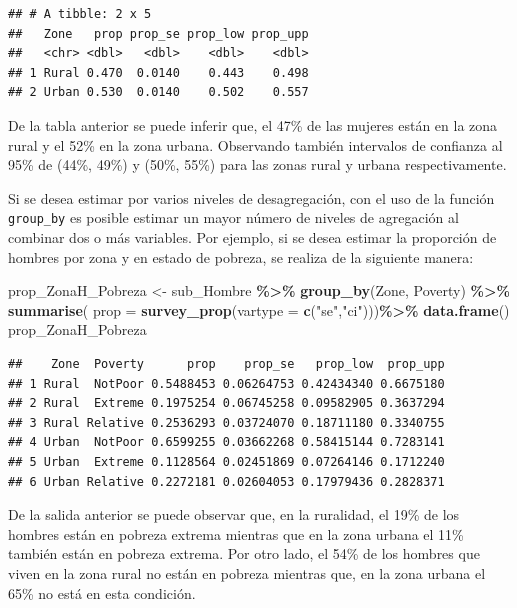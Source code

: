 \documentclass[
  12pt,
]{book}
\newenvironment{Shaded}{\begin{snugshade}}{\end{snugshade}}
\newcommand{\AttributeTok}[1]{\textcolor[rgb]{0.13,0.29,0.53}{#1}}
\newcommand{\FunctionTok}[1]{\textcolor[rgb]{0.13,0.29,0.53}{\textbf{#1}}}
\newcommand{\NormalTok}[1]{#1}
\newcommand{\OtherTok}[1]{\textcolor[rgb]{0.56,0.35,0.01}{#1}}
\newcommand{\SpecialCharTok}[1]{\textcolor[rgb]{0.81,0.36,0.00}{\textbf{#1}}}
\newcommand{\StringTok}[1]{\textcolor[rgb]{0.31,0.60,0.02}{#1}}
\begin{document}
\begin{verbatim}
## # A tibble: 2 x 5
##   Zone   prop prop_se prop_low prop_upp
##   <chr> <dbl>   <dbl>    <dbl>    <dbl>
## 1 Rural 0.470  0.0140    0.443    0.498
## 2 Urban 0.530  0.0140    0.502    0.557
\end{verbatim}

De la tabla anterior se puede inferir que, el 47\% de las mujeres están en la zona rural y el 52\% en la zona urbana. Observando también intervalos de confianza al 95\% de (44\%, 49\%) y (50\%, 55\%) para las zonas rural y urbana respectivamente.

Si se desea estimar por varios niveles de desagregación, con el uso de la función \texttt{group\_by} es posible estimar un mayor número de niveles de agregación al combinar dos o más variables. Por ejemplo, si se desea estimar la proporción de hombres por zona y en estado de pobreza, se realiza de la siguiente manera:

\begin{Shaded}
\begin{Highlighting}[]
\NormalTok{prop\_ZonaH\_Pobreza }\OtherTok{\textless{}{-}}\NormalTok{ sub\_Hombre }\SpecialCharTok{\%\textgreater{}\%}
                      \FunctionTok{group\_by}\NormalTok{(Zone, Poverty) }\SpecialCharTok{\%\textgreater{}\%} 
                      \FunctionTok{summarise}\NormalTok{(}
                      \AttributeTok{prop =} \FunctionTok{survey\_prop}\NormalTok{(}\AttributeTok{vartype =} \FunctionTok{c}\NormalTok{(}\StringTok{"se"}\NormalTok{,}\StringTok{"ci"}\NormalTok{)))}\SpecialCharTok{\%\textgreater{}\%}
                      \FunctionTok{data.frame}\NormalTok{()}
\NormalTok{prop\_ZonaH\_Pobreza}
\end{Highlighting}
\end{Shaded}

\begin{verbatim}
##    Zone  Poverty      prop    prop_se   prop_low  prop_upp
## 1 Rural  NotPoor 0.5488453 0.06264753 0.42434340 0.6675180
## 2 Rural  Extreme 0.1975254 0.06745258 0.09582905 0.3637294
## 3 Rural Relative 0.2536293 0.03724070 0.18711180 0.3340755
## 4 Urban  NotPoor 0.6599255 0.03662268 0.58415144 0.7283141
## 5 Urban  Extreme 0.1128564 0.02451869 0.07264146 0.1712240
## 6 Urban Relative 0.2272181 0.02604053 0.17979436 0.2828371
\end{verbatim}

De la salida anterior se puede observar que, en la ruralidad, el 19\% de los hombres están en pobreza extrema mientras que en la zona urbana el 11\% también están en pobreza extrema. Por otro lado, el 54\% de los hombres que viven en la zona rural no están en pobreza mientras que, en la zona urbana el 65\% no está en esta condición.
\end{document}
